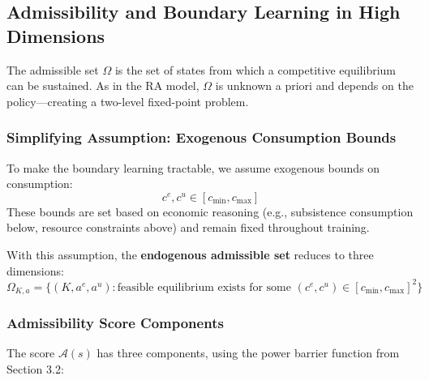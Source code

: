 \subsection{Admissibility and Boundary Learning in High Dimensions}

The admissible set $\Omega$ is the set of states from which a competitive equilibrium can be sustained. As in the RA model, $\Omega$ is unknown a priori and depends on the policy—creating a two-level fixed-point problem.

\subsubsection{Simplifying Assumption: Exogenous Consumption Bounds}

To make the boundary learning tractable, we assume exogenous bounds on consumption:
\begin{equation}
    c^e, c^u \in [c_{\min}, c_{\max}]
\end{equation}
These bounds are set based on economic reasoning (e.g., subsistence consumption below, resource constraints above) and remain fixed throughout training.

With this assumption, the \textbf{endogenous admissible set} reduces to three dimensions:
\begin{equation}
    \Omega_{K,a} = \{(K, a^e, a^u) : \text{feasible equilibrium exists for some } (c^e, c^u) \in [c_{\min}, c_{\max}]^2\}
\end{equation}

\subsubsection{Admissibility Score Components}

The score $\mathcal{A}(s)$ has three components, using the power barrier function from Section 3.2:

